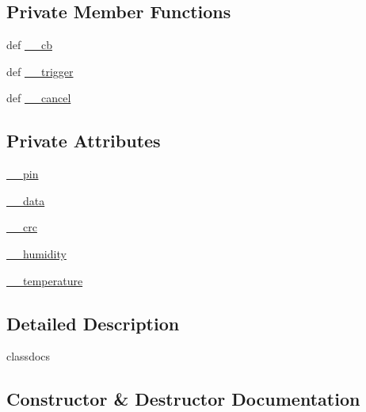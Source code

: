 \subsection*{Private Member Functions}
\begin{DoxyCompactItemize}
\item 
def \hyperlink{classconcretesensor_1_1dht22Humidity_1_1DHT22Humidity_a5d7ae87c593f802a0914ddb6dfe90ee7}{\+\_\+\+\_\+cb}
\item 
def \hyperlink{classconcretesensor_1_1dht22Humidity_1_1DHT22Humidity_a5576be04a2f296d52ea1beca8af86473}{\+\_\+\+\_\+trigger}
\item 
def \hyperlink{classconcretesensor_1_1dht22Humidity_1_1DHT22Humidity_a4934a9ee1ef44f45db0427e06323918f}{\+\_\+\+\_\+cancel}
\end{DoxyCompactItemize}
\subsection*{Private Attributes}
\begin{DoxyCompactItemize}
\item 
\hyperlink{classconcretesensor_1_1dht22Humidity_1_1DHT22Humidity_a56980f310a5acb94177e2a5bbfdbcb8c}{\+\_\+\+\_\+pin}
\item 
\hyperlink{classconcretesensor_1_1dht22Humidity_1_1DHT22Humidity_adb968172f9402423d1d50314f353c41b}{\+\_\+\+\_\+data}
\item 
\hyperlink{classconcretesensor_1_1dht22Humidity_1_1DHT22Humidity_afa5e387a1c762058f8ebc03c3288b4d3}{\+\_\+\+\_\+crc}
\item 
\hyperlink{classconcretesensor_1_1dht22Humidity_1_1DHT22Humidity_abd492619c0d6b7424adb6fb4bd02e1b6}{\+\_\+\+\_\+humidity}
\item 
\hyperlink{classconcretesensor_1_1dht22Humidity_1_1DHT22Humidity_a06e825aa1e690e55f5a0726c0fe29ae5}{\+\_\+\+\_\+temperature}
\end{DoxyCompactItemize}


\subsection{Detailed Description}
\begin{DoxyVerb}classdocs
\end{DoxyVerb}
 

\subsection{Constructor \& Destructor Documentation}
\hypertarget{classconcretesensor_1_1dht22Humidity_1_1DHT22Humidity_aac6d08610e3f87e56de17bddc4e74bcf}{}
